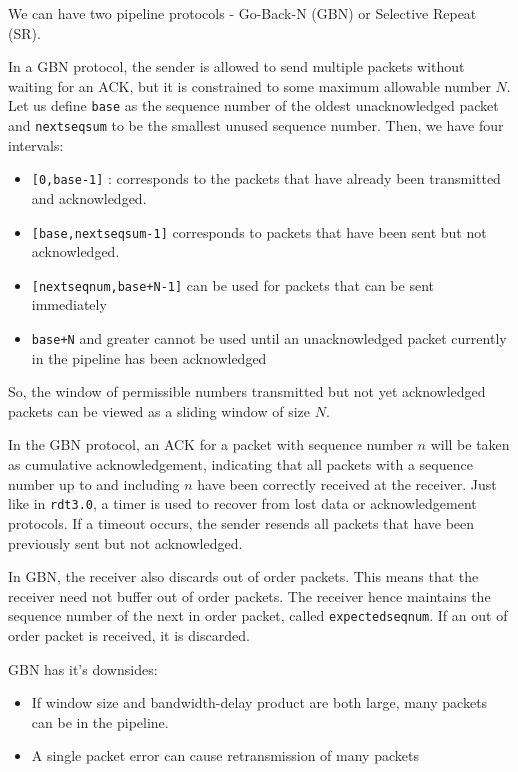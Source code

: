 \documentclass[12pt,letterpaper]{article}
\theoremstyle{definition}
\begin{document}
We can have two pipeline protocols - Go-Back-N (GBN) or Selective Repeat (SR).

In a GBN protocol, the sender is  allowed to send multiple packets without waiting for an ACK, but it is constrained to some maximum allowable number $N$. Let us define \texttt{base} as the sequence number of the oldest unacknowledged packet and \texttt{nextseqsum} to be the smallest unused sequence number. Then, we have four intervals:

\begin{itemize}
  \item \texttt{[0,base-1]} : corresponds to the packets that have already been transmitted and acknowledged.
  \item \texttt{[base,nextseqsum-1]} corresponds to packets that have been sent but not acknowledged.
  \item \texttt{[nextseqnum,base+N-1]} can be used for packets that can be sent immediately
  \item \texttt{base+N} and greater cannot be used until an unacknowledged packet currently in the pipeline has been acknowledged 
\end{itemize}

So, the window of permissible numbers transmitted but not yet acknowledged packets can be viewed as a sliding window of size $N$.

In the GBN protocol, an ACK for a packet with sequence number $n$ will be taken as cumulative acknowledgement, indicating that all packets with a sequence number up to and including $n$ have been correctly received at the receiver. Just like in \texttt{rdt3.0}, a timer is used to recover from lost data or acknowledgement protocols. If a timeout occurs, the sender resends all packets that have been previously sent but not acknowledged.

In GBN, the receiver also discards out of order packets. This means that the receiver need not buffer out of order packets. The receiver hence maintains the sequence number of the next in order packet, called \texttt{expectedseqnum}. If an out of order packet is received, it is discarded.

GBN has it's downsides:

\begin{itemize}
  \item If window size and bandwidth-delay product are both large, many packets can be in the pipeline.
  \item A single packet error can cause retransmission of many packets
\end{itemize}
\end{document}
